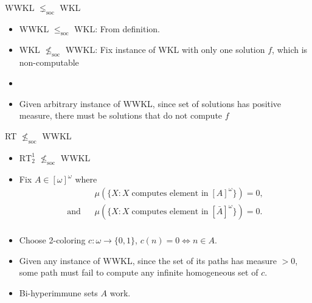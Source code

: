 \begin{frame}{WWKL $\lneq_{\text{soc}}$ WKL}
  \begin{itemize}
    \item WWKL $\leq_{\text{soc}}$ WKL: From definition.
    \item WKL $\nleq_{\text{soc}}$ WWKL: Fix instance of WKL with only one
      solution $f$, which is non-computable
    \item {}
    \item Given arbitrary instance of WWKL, since set of solutions has
      positive measure, there must be solutions that do not compute $f$ 
  \end{itemize}
\end{frame}

\begin{frame}{RT $\nleq_{\text{soc}}$ WWKL}
  \begin{itemize}
    \item $\text{RT}_2^1$ $\nleq_{\text{soc}}$ WWKL
    \item Fix $A\in[\omega]^\omega$ where
      \begin{align*}
        &\mu(\{X: X\; \text{computes element in}\; [A]^\omega\}) =0,\\
        \text{and}\;\;\; &\mu(\{X: X\; \text{computes element in}\;
        [\bar{A}]^\omega\}) =0.\\
      \end{align*}
    \item Choose 2-coloring $c:\omega\rightarrow\{0,1\}$, $c(n)=0
      \Leftrightarrow n\in A$.
    \item Given any instance of WWKL, since the set of its paths has
      measure $>0$, some path must fail to compute any infinite
      homogeneous set of $c$. 
    \item Bi-hyperimmune sets $A$ work.
  \end{itemize}
\end{frame}

